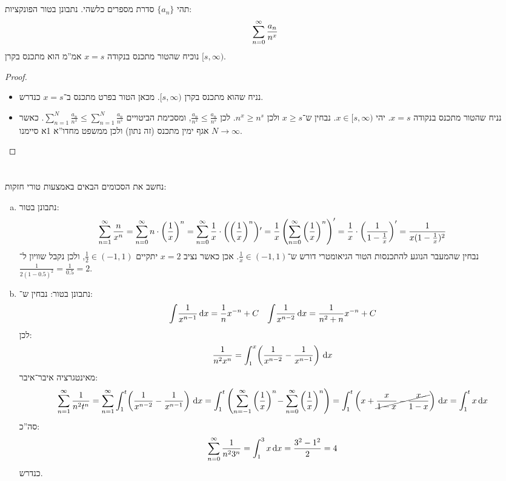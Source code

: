\documentclass[]{../../../../tex/classes/homework}
\begin{document}
	\section{}
	תהי $\{a_n\}$ סדרת מספרים כלשהי. נתבונן בטור הפונקציות: 
	\[ \sum_{n = 0}^{\infty} \frac{a_n}{n^{x}} \]
	נוכיח שהטור מתכנס בנקודה $x = s$ אמ''מ הוא מתכנס בקרן $[s, \infty)$. 
	\begin{proof}
		\begin{itemize}
			\item[$\implies$]נניח שהוא מתכנס בקרן $[s, \infty)$. מכאן הטור בפרט מתכנס ב־$x = s$ כנדרש. 
			\item[$\impliedby$]נניח שהטור מתכנס בנקודה $x = s$. יהי $x \in [s, \infty)$. נבחין ש־$x \ge s$ ולכן $n^{x}\ge n^{s}$. לכן $\frac{a_n}{n^{x}} \le \frac{a_n}{n^{s}}$, ומסכימת הביטויים $\sum^{N}_{n = 1}\frac{a_n}{n^{x}} \le \sum^{N}_{n =1}\frac{a_n}{n^{s}}$. כאשר $N \to \infty$ אגף ימין מתכנס (זה נתון) ולכן ממשפט מחדו''א 1א סיימנו. 
		\end{itemize}
	\end{proof}
	
	\section{}
	נחשב את הסכומים הבאים באמצעות טורי חזקות: 
	\begin{enumerate}[(a)]
		\item נתבונן בטור: 
		\[ \sum^{\infty}_{n = 1}\frac{n}{x^{n}} = \sum_{n = 0}^{\infty} n \cdot \left ( \frac{1}{x} \right )^{n} = \sum_{n = 0}^{\infty} \frac{1}{x} \cdot \left ( \left ( \frac{1}{x} \right )^{n} \right )\!' = \frac{1}{x}\left ( \sum_{n = 0}^{\infty} \left ( \frac{1}{x} \right )^{n} \right )' = \frac{1}{x} \cdot\left ( \frac{1}{1 - \frac{1}{x}} \right )' = \frac{1}{x(1 - \frac{1}{x})^{2}} \]
		נבחין שהמעבר הנוגע להתכנסות הטור הגיאומטרי דורש ש־$\frac{1}{x} \in (-1, 1)$. אכן כאשר נציב $x =2$ יתקיים $\frac{1}{2} \in (-1, 1)$, ולכן נקבל שוויון ל־$\frac{1}{2(1 - 0.5)^{2}} = \frac{1}{0.5} = 2$. 
		\item נתבונן בטור: 
		נבחין ש־: 
		\begin{align*}
			\int\! \frac{1}{x^{n - 1}}\,\mathrm{d}x = \frac{1}{n}x^{-n} + C &&
			\int \! \frac{1}{x^{n - 2}}\,\mathrm{d}x = \frac{1}{n^{2} + n}x^{-n} + C
		\end{align*}
		לכן: 
		\[ \frac{1}{n^{2}x^{n}} = \int_1^{x} \! \left ( \frac{1}{x^{n - 2}} - \frac{1}{x^{n - 1}} \right )\,\mathrm{d}x \]
		מאינטגרציה איבר־איבר: 
		\[ \sum_{n = 1}^{\infty} \frac{1}{n^{2}t^{n}} = \sum_{n = 1}^{\infty} \int^{t}_1\!\left ( \frac{1}{x^{n - 2}} - \frac{1}{x^{n - 1}} \right )\,\mathrm{d}x = \int^{t}_1 \left ( \sum_{n = -1}^{\infty} \left ( \frac{1}{x} \right )^{n} \!- \sum_{n = 0}^{\infty} \left ( \frac{1}{x} \right )^{n} \right ) = \int^{t}_1 \left ( x + \cancel{\frac{x}{1 - x} - \frac{x}{1 - x}} \right )\,\mathrm{d}x = \int^{t}_1x\,\mathrm{d}x \]
		סה''כ: 
		\[ \sum_{n = 0}^{\infty} \frac{1}{n^{2}3^{n}} = \int^{3}_1 x\,\mathrm{d}x = \frac{3^{2} - 1^{2}}{2} = 4 \]
		כנדרש. 
	\end{enumerate}
	
\end{document}
